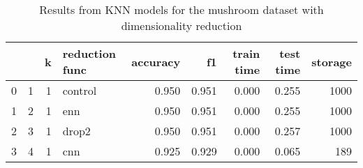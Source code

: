 \begin{table}
\centering
\caption{Results from KNN models for the mushroom dataset with dimensionality reduction}
\begin{tabular}{lrrlrrrrr}
\toprule
 &  & k & reduction func & accuracy & f1 & train time & test time & storage \\
\midrule
0 & 1 & 1 & control & 0.950 & 0.951 & 0.000 & 0.255 & 1000 \\
1 & 2 & 1 & enn & 0.950 & 0.951 & 0.000 & 0.255 & 1000 \\
2 & 3 & 1 & drop2 & 0.950 & 0.951 & 0.000 & 0.257 & 1000 \\
3 & 4 & 1 & cnn & 0.925 & 0.929 & 0.000 & 0.065 & 189 \\
\bottomrule
\end{tabular}
\end{table}
